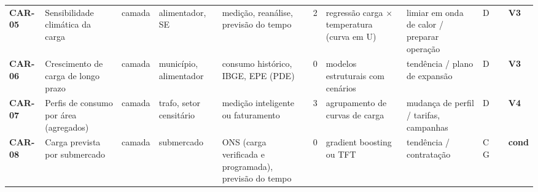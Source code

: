{\begin{longtable}{@{}P{1.35cm}P{4.1cm}P{1.3cm}P{3.1cm}P{3.7cm}C{0.6cm}P{3.6cm}P{3.3cm}P{1.1cm}P{0.9cm}P{1.1cm}@{}}
\textbf{CAR-05} & Sensibilidade climática da carga & camada & alimentador, SE & medição, reanálise, previsão do tempo & 2 & regressão carga $\times$ temperatura (curva em U) & limiar em onda de calor / preparar operação & D &  & \colorbox{fV3}{\scriptsize \textbf{V3}} \\
\textbf{CAR-06} & Crescimento de carga de longo prazo & camada & município, alimentador & consumo histórico, IBGE, EPE (PDE) & 0 & modelos estruturais com cenários & tendência / plano de expansão & D &  & \colorbox{fV3}{\scriptsize \textbf{V3}} \\
\textbf{CAR-07} & Perfis de consumo por área (agregados) & camada & trafo, setor censitário & medição inteligente ou faturamento & 3 & agrupamento de curvas de carga & mudança de perfil / tarifas, campanhas & D &  & \colorbox{fV4}{\scriptsize \textbf{V4}} \\
\textbf{CAR-08} & Carga prevista por submercado & camada & submercado & ONS (carga verificada e programada), previsão do tempo & 0 & gradient boosting ou TFT & tendência / contratação & C G &  & \colorbox{fCond}{\scriptsize \textbf{cond}} \\
\bottomrule
\end{longtable}}


